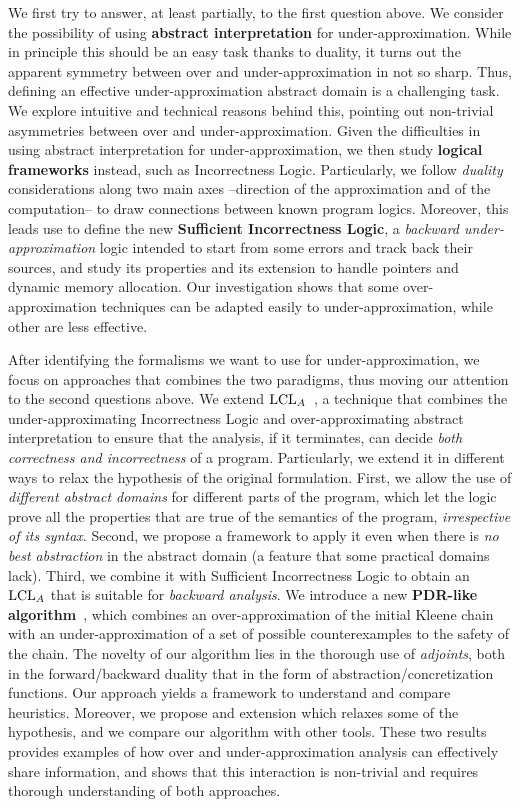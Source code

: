 We first try to answer, at least partially, to the first question above.
We consider the possibility of using \textbf{abstract interpretation} for under\hyp{}approximation. While in principle this should be an easy task thanks to duality, it turns out the apparent symmetry between over and under-approximation in not so sharp. Thus, defining an effective under-approximation abstract domain is a challenging task. We explore intuitive and technical reasons behind this, pointing out non-trivial asymmetries between over and under-approximation.
Given the difficulties in using abstract interpretation for under\hyp{}approximation, we then study \textbf{logical frameworks} instead, such as Incorrectness Logic. Particularly, we follow \emph{duality} considerations along two main axes --direction of the approximation and of the computation-- to draw connections between known program logics. Moreover, this leads use to define the new \textbf{Sufficient Incorrectness Logic}, a \emph{backward under-approximation} logic intended to start from some errors and track back their sources, and study its properties and its extension to handle pointers and dynamic memory allocation.
Our investigation shows that some over-approximation techniques can be adapted easily to under-approximation, while other are less effective.

After identifying the formalisms we want to use for under-approximation, we focus on approaches that combines the two paradigms, thus moving our attention to the second questions above.
We extend \textbf{$\text{LCL}_A$}~\cite{BGGR23}, a technique that combines the under-approximating Incorrectness Logic and over-approximating abstract interpretation to ensure that the analysis, if it terminates, can decide \emph{both correctness and incorrectness} of a program. Particularly, we extend it in different ways to relax the hypothesis of the original formulation. First, we allow the use of \emph{different abstract domains} for different parts of the program, which let the logic prove all the properties that are true of the semantics of the program, \emph{irrespective of its syntax}. Second, we propose a framework to apply it even when there is \emph{no best abstraction} in the abstract domain (a feature that some practical domains lack). Third, we combine it with Sufficient Incorrectness Logic to obtain an $\text{LCL}_A$ that is suitable for \emph{backward analysis}.
We introduce a new \textbf{PDR-like algorithm}~\cite{Bradley11}, which combines an over\hyp{}approximation of the initial Kleene chain with an under-approximation of a set of possible counterexamples to the safety of the chain. The novelty of our algorithm lies in the thorough use of \emph{adjoints}, both in the forward/backward duality that in the form of abstraction/concretization functions. Our approach yields a framework to understand and compare heuristics. Moreover, we propose and extension which relaxes some of the hypothesis, and we compare our algorithm with other tools.
These two results provides examples of how over and under-approximation analysis can effectively share information, and shows that this interaction is non-trivial and requires thorough understanding of both approaches.

